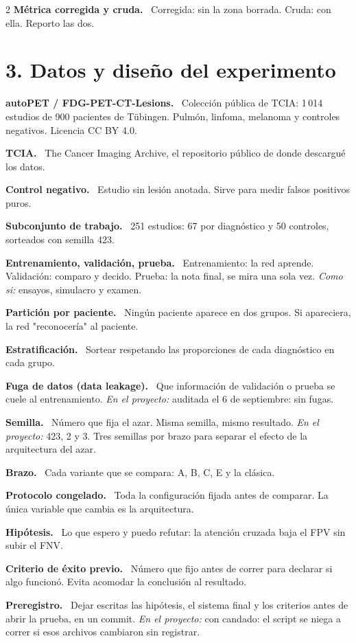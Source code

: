\documentclass[9pt,a4paper]{extarticle}
\newcommand{\T}[1]{{\sffamily\bfseries\color{tinta}#1.}\ }
\newcommand{\aqui}[1]{{\color{acento}\itshape En el proyecto:} #1}
\newcommand{\como}[1]{{\itshape Como si:} #1}
\begin{document}
\begin{multicols}{2}
\T{Métrica corregida y cruda} Corregida: sin la zona borrada. Cruda: con ella. Reporto las dos.

\section{3. Datos y diseño del experimento}

\T{autoPET / FDG-PET-CT-Lesions} Colección pública de TCIA: 1\,014 estudios de 900 pacientes de Tübingen. Pulmón, linfoma, melanoma y controles negativos. Licencia CC BY 4.0.

\T{TCIA} The Cancer Imaging Archive, el repositorio público de donde descargué los datos.

\T{Control negativo} Estudio sin lesión anotada. Sirve para medir falsos positivos puros.

\T{Subconjunto de trabajo} 251 estudios: 67 por diagnóstico y 50 controles, sorteados con semilla 423.

\T{Entrenamiento, validación, prueba} Entrenamiento: la red aprende. Validación: comparo y decido. Prueba: la nota final, se mira una sola vez. \como{ensayos, simulacro y examen.}

\T{Partición por paciente} Ningún paciente aparece en dos grupos. Si apareciera, la red "reconocería" al paciente.

\T{Estratificación} Sortear respetando las proporciones de cada diagnóstico en cada grupo.

\T{Fuga de datos (data leakage)} Que información de validación o prueba se cuele al entrenamiento. \aqui{auditada el 6 de septiembre: sin fugas.}

\T{Semilla} Número que fija el azar. Misma semilla, mismo resultado. \aqui{423, 2 y 3. Tres semillas por brazo para separar el efecto de la arquitectura del azar.}

\T{Brazo} Cada variante que se compara: A, B, C, E y la clásica.

\T{Protocolo congelado} Toda la configuración fijada antes de comparar. La única variable que cambia es la arquitectura.

\T{Hipótesis} Lo que espero y puedo refutar: la atención cruzada baja el FPV sin subir el FNV.

\T{Criterio de éxito previo} Número que fijo antes de correr para declarar si algo funcionó. Evita acomodar la conclusión al resultado.

\T{Preregistro} Dejar escritas las hipótesis, el sistema final y los criterios antes de abrir la prueba, en un commit. \aqui{con candado: el script se niega a correr si esos archivos cambiaron sin registrar.}


\end{multicols}
\end{document}
